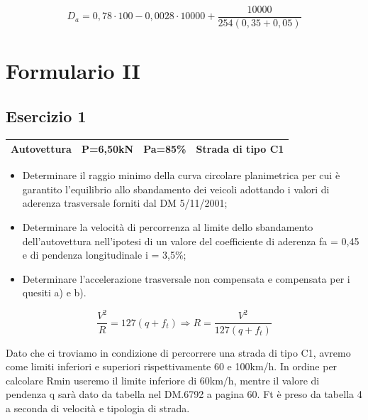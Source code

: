 \documentclass[
a4paper,
12pt, 
twoside]{scrbook}
\begin{document}
{{{{{{    \begin{equation}
    	D_a=0,78\cdot 100-0,0028\cdot 10000+\frac{10000}{254(0,35+0,05)}
    \end{equation} 		
    	
   \chapter{Formulario II} 	
    	
   \section{Esercizio 1} 	
   {
   	\centering
   	\begin{tabular}{|c|c|c|c|}
   		\hline
   		\rule[-1ex]{0pt}{2.5ex}  Autovettura & P=6,50kN & Pa=85\% & Strada di tipo C1 \\
   		\hline
   	\end{tabular}\par
   }
   \leavevmode\newline
   \begin{boxK}
   	\begin{itemize}
   		\item Determinare il raggio minimo della curva circolare planimetrica per cui è garantito l’equilibrio allo sbandamento dei veicoli adottando i valori di aderenza trasversale forniti dal DM 5/11/2001; 
   		\item Determinare la velocità di percorrenza al limite dello sbandamento dell’autovettura nell'ipotesi di un valore del coefficiente di aderenza fa = 0,45 e di pendenza longitudinale i = 3,5\%; 
   		\item Determinare l’accelerazione trasversale non compensata e compensata per i quesiti a) e b). 
   	\end{itemize}
   \end{boxK}  
   
   \begin{equation}
   	\frac{V^2}{R}=127(q+f_t)\Rightarrow R=\frac{V^2}{127(q+f_t)}
   \end{equation} 		
   
   \begin{boxF}
   	Dato che ci troviamo in condizione di percorrere una strada di tipo C1, avremo come limiti inferiori e superiori rispettivamente 60 e 100km/h. In ordine per calcolare Rmin useremo il limite inferiore di 60km/h, mentre il valore di pendenza q sarà dato da tabella nel DM.6792 a pagina 60. Ft è preso da tabella 4 a seconda di velocità e tipologia di strada.
   \end{boxF}
 	   
}}}}}}
\end{document}
